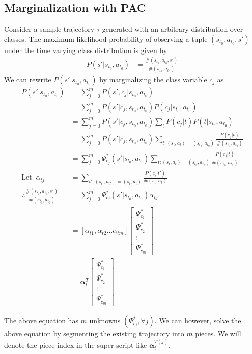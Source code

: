\documentclass{article}[11pt]
\begin{document}
\subsection{Marginalization with PAC}
Consider a sample trajectory $\tau$ generated with an arbitrary distribution over classes. The maximum likelihood probability of observing a tuple $(s_{t_0},a_{t_0}, s')$ under the time varying class distribution is given by 
\begin{align*}
P(s'|s_{t_0},a_{t_0}) &= \frac{\#(s_{t_0},a_{t_0}, s')}{\#(s_{t_0},a_{t_0})}
\end{align*}We can rewrite $P(s'|s_{t_0},a_{t_0})$ by marginalizing the class variable $c_j$ as
\begin{align*}
P(s'|s_{t_0},a_{t_0}) &= \sum_{j=0}^mP(s',c_j|s_{t_0},a_{t_0})\\
&= \sum_{j=0}^mP(s'|c_j,s_{t_0},a_{t_0})P(c_j|s_{t_0},a_{t_0})\\
&= \sum_{j=0}^mP(s'|c_j,s_{t_0},a_{t_0})\sum_tP(c_j|t)P(t|s_{t_0},a_{t_0})\\
&= \sum_{j=0}^mP(s'|c_j,s_{t_0},a_{t_0})\sum_{t:(s_{t},a_{t}) = (s_{t_0},a_{t_0})}\frac{P(c_j|t)}{\#(s_{t_0},a_{t_0})}\\
&= \sum_{j=0}^m \Psi^*_{c_j}(s'|s_{t_0},a_{t_0})\sum_{t:(s_{t},a_{t}) = (s_{t_0},a_{t_0})}\frac{P(c_j|t)}{\#(s_{t_0},a_{t_0})}\\
\text{Let } \ \alpha_{tj} &= \sum_{t':(s_{t'},a_{t'}) = (s_{t},a_{t})} \frac{P(c_j|t')}{\#(s_{t},a_{t})}\\
\therefore \frac{\#(s_{t_0},a_{t_0}, s')}{\#(s_{t_0},a_{t_0})} & = \sum_{j=0}^m \Psi^*_{c_j}(s'|s_{t_0},a_{t_0})\alpha_{tj}\\
&= [\alpha_{t1}, \alpha_{t2} \hdots \alpha_{tm}] \begin{bmatrix}
\Psi^*_{c_1}\\\Psi^*_{c_2}\\ \vdots\\ \Psi^*_{c_m}
\end{bmatrix}\\
&= \bm{\alpha}_t^T \begin{bmatrix}
\Psi^*_{c_1}\\\Psi^*_{c_2}\\ \vdots\\ \Psi^*_{c_m}
\end{bmatrix}
\end{align*}

The above equation has $m$ unknowns $(\Psi^*_{c_j}, \forall j)$. We can however, solve the above equation by segmenting the existing trajectory into $m$ pieces. We will denote the piece index in the super script like $\bm{\alpha}_t^{T(j)}$. 
\end{document}
